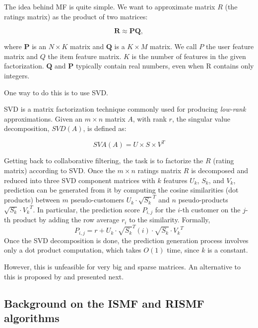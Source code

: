 \documentclass[11pt]{amsart}
\begin{document}
The idea behind MF is quite simple. We want to approximate matrix $R$ (the ratings matrix) as the product of two matrices:

\begin{equation}
  \mathbf{R} \approx \mathbf{P}\mathbf{Q},
\end{equation}

where $\mathbf{P}$ is an $N \times K$ matrix and $\mathbf{Q}$ is a $K \times M$ matrix. We call $P$ the user feature matrix and $Q$ the item feature matrix. $K$ is the number of features in the given factorization. $\mathbf{Q}$ and $\mathbf{P}$ typically contain real numbers, even when R contains only integers.

One way to do this is to use SVD. 

SVD is a matrix factorization technique commonly used for producing \emph{low-rank} approximations. Given an $m \times n$ matrix $A$, with rank $r$, the singular value decomposition, $SVD(A)$, is defined as:

\begin{equation}
  SVA(A) = U \times S \times V^T
\end{equation}

Getting back to collaborative filtering, the task is to factorize the $R$ (rating matrix) according to SVD. Once the $m \times n$ ratings matrix $R$ is decomposed and reduced into three SVD component matrices with $k$ features $U_k$, $S_k$, and $V_k$, prediction can be generated from it by computing the cosine similarities (dot products) between $m$ pseudo-customers $U_k \cdot {\sqrt{S_k}^T}$ and $n$ pseudo-products ${\sqrt{S_k} \cdot {V_k}^T}$. In particular, the prediction score $P_{i,j}$ for the $i$-th customer on the $j$-th product by adding the row average $r_i$ to the similarity. Formally, 
\begin{equation}
  P_{i,j} = r + U_k \cdot {\sqrt{S_k}^T}(i) \cdot {\sqrt{S_k} \cdot {V_k}^T}
\end{equation}
Once the SVD decomposition is done, the prediction generation process involves only a dot product computation, which takes $O(1)$ time, since $k$ is a constant.

However, this is unfeasible for very big and sparse matrices. An alternative to this is proposed by \cite{takacs09scalable} and presented next. 

\subsection{Background on the ISMF and RISMF algorithms}
\label{ismf}
\end{document}
